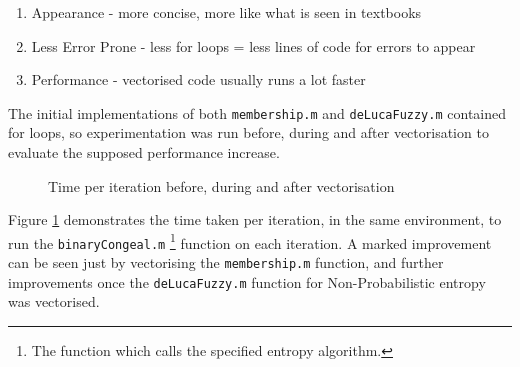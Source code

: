 \begin{enumerate}
    \item Appearance - more concise, more like what is seen in textbooks
    \item Less Error Prone - less for loops = less lines of code for errors to appear
    \item Performance - vectorised code usually runs a lot faster
\end{enumerate}

The initial implementations of both \texttt{membership.m} and \texttt{deLucaFuzzy.m} contained for loops, so experimentation was run before, during and after vectorisation to evaluate the supposed performance increase.

\begin{figure}[H]
  \centering
    \caption{Time per iteration before, during and after vectorisation}
    \label{fig:time-per-iteration}
\end{figure}

Figure \ref{fig:time-per-iteration} demonstrates the time taken per iteration, in the same environment, to run the \texttt{binaryCongeal.m} \footnote{The function which calls the specified entropy algorithm.} function on each iteration. A marked improvement can be seen just by vectorising the \texttt{membership.m} function, and further improvements once the \texttt{deLucaFuzzy.m} function for Non-Probabilistic entropy was vectorised.


